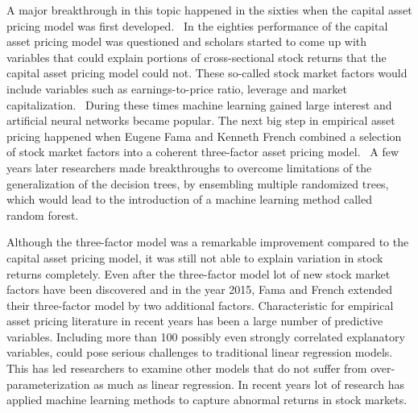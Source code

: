 \documentclass[12pt]{article}
\begin{document}

A major breakthrough in this topic happened in the sixties when the capital asset pricing model was first developed.\footnotemark {} \ In the eighties performance of the capital asset pricing model was questioned and scholars started to come up with variables that could explain portions of cross-sectional stock returns that the capital asset pricing model could not. These so-called stock market factors would include variables such as earnings-to-price ratio, leverage and market capitalization.\footnotemark  {} \ During these times machine learning gained large interest and artificial neural networks became popular. The next big step in empirical asset pricing happened when Eugene Fama and Kenneth French combined a selection of stock market factors into a coherent three-factor asset pricing model.\footnotemark {} \ A few years later researchers made breakthroughs to overcome limitations of the generalization of the decision trees, by ensembling multiple randomized trees, which would lead to the introduction of a machine learning method called random forest.\footnotemark {} \par

Although the three-factor model was a remarkable improvement compared to the capital asset pricing model, it was still not able to explain variation in stock returns completely. Even after the three-factor model lot of new stock market factors have been discovered and in the year 2015, Fama and French extended their three-factor model by two additional factors.\footnotemark {} Characteristic for empirical asset pricing literature in recent years has been a large number of predictive variables. Including more than 100 possibly even strongly correlated explanatory variables, could pose serious challenges to traditional linear regression models. This has led researchers to examine other models that do not suffer from over-parameterization as much as linear regression. In recent years lot of research has applied machine learning methods to capture abnormal returns in stock markets.  \par
\end{document}

